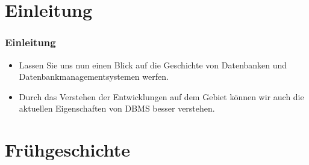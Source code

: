 \documentclass[aspectratio=169,mathserif,notheorems]{beamer}%
\subtitle{4.~Geschichte}%
\begin{document}
%
%
\startPresentation%
%
\section{Einleitung}%
%
\begin{frame}[t]%
\frametitle{Einleitung}%
\begin{itemize}%
%
\item Lassen Sie uns nun einen Blick auf die Geschichte von Datenbanken und Datenbankmanagementsystemen werfen\cite{S2024D:THOD,Q2022ATODHDM,M2024ABHOD,YM2024DDMSD,F2021ABHODM}.%
\item<2-> Durch das Verstehen der Entwicklungen auf dem Gebiet können wir auch die aktuellen Eigenschaften von DBMS besser verstehen.%
%
\end{itemize}%
\end{frame}%
%
\section{Frühgeschichte}%
%
\end{document}
